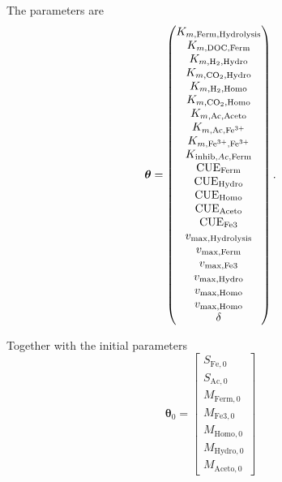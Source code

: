 \documentclass{article}
\begin{document}
The parameters are
\begin{equation}
\bm{\theta} = \begin{pmatrix}
                K_{m,\mathrm{Ferm},\mathrm{Hydrolysis}}\\
                K_{m,\mathrm{DOC},\mathrm{Ferm}}\\
                K_{m,\mathrm{\mathrm{H_2}},\mathrm{Hydro}}\\
                K_{m,\mathrm{\mathrm{CO_2}},\mathrm{Hydro}}\\
                K_{m,\mathrm{\mathrm{H_2}},\mathrm{Homo}}\\
                K_{m,\mathrm{\mathrm{CO_2}},\mathrm{Homo}}\\
                K_{m,\mathrm{Ac},\mathrm{Aceto}}\\
                K_{m,\mathrm{Ac},\mathrm{\mathrm{Fe}^{3+}}}\\
                K_{m,\mathrm{\mathrm{Fe}^{3+}},\mathrm{\mathrm{Fe}^{3+}}}\\
                K_{\mathrm{inhib},Ac,\mathrm{Ferm}}\\
                \mathrm{CUE}_{\mathrm{Ferm}}\\
                \mathrm{CUE}_{\mathrm{Hydro}}\\
                \mathrm{CUE}_{\mathrm{Homo}}\\
                \mathrm{CUE}_{\mathrm{Aceto}}\\
                \mathrm{CUE}_{\mathrm{Fe3}}\\
                v_{\max,\mathrm{Hydrolysis}}\\
                v_{\max,\mathrm{Ferm}}\\
                v_{\max,\mathrm{Fe3}}\\
                v_{\max,\mathrm{Hydro}}\\
                v_{\max,\mathrm{Homo}}\\
                v_{\max,\mathrm{Homo}}\\
                \delta
                \end{pmatrix}.
\end{equation} %


Together with the initial parameters
\begin{equation}
\bm{\theta}_0 = \begin{bmatrix}
S_{\mathrm{Fe},0}\\
S_{\mathrm{Ac},0}\\
M_{\mathrm{Ferm},0}\\
M_{\mathrm{Fe3},0}\\
M_{\mathrm{Homo},0}\\
M_{\mathrm{Hydro},0}\\
M_{\mathrm{Aceto},0}
\end{bmatrix}
\end{equation}
\end{document}
